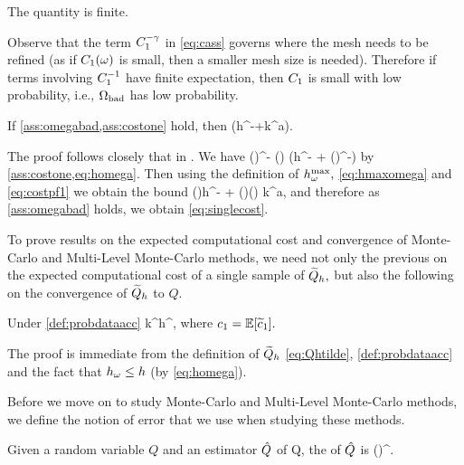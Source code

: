 \label{ass:omegabad}
The quantity
\beq\label{eq:cass}
\cth \de {}
\eeq
is finite.
\eas

Observe that the term $C_{1}^{-\gamma}$ in \cref{eq:cass} governs where the mesh needs to be refined (as if $C_{1}(\omega)$ is small, then a smaller mesh size is needed). Therefore if terms involving $C_{1}^{-1}$ have finite expectation, then $C_{1}$ is small with low probability, i.e., $\Omega_{\mathrm{bad}}$ has low probability.

\label{lem:c}
If \cref{ass:omegabad,ass:costone} hold, then 
\beq\label{eq:singlecost}
\EXP{\Cost{\Qhtilde}} \leq \cth \mleft(h^{-\gamma}+k^{a\gamma}\mright).
\eeq
\ele

The proof follows closely that in \cite[Lemma 5.8]{GrPaSc:19}.
We have
\beq\label{eq:costpf1}
\Cost{\Qhtilde(\omega)} \leq \cthtilde(\omega)\homega^{-\gamma} \leq \cthtilde(\omega) \mleft(h^{-\gamma} + \mleft(\hmaxomega\mright)^{-\gamma}\mright)
\eeq
by \cref{ass:costone,eq:homega}. Then using  the definition of $h^{\max}_{\omega},$ \cref{eq:hmaxomega} and \cref{eq:costpf1} we obtain the bound
\beq\label{eq:costpf2}
\Cost{\Qhtilde(\omega)} \leq \cthtilde(\omega)h^{-\gamma} + \mleft(\cthtilde\Co\mright)(\omega) k^{a\gamma},
\eeq
and therefore as \cref{ass:omegabad} holds, we obtain \cref{eq:singlecost}.
\epf

To prove results on the expected computational cost and convergence of Monte-Carlo and Multi-Level Monte-Carlo methods, we need not only the previous  on the expected computational cost of a single sample of $\widetilde{Q}_{h},$ but also the following  on the convergence of $\widetilde{Q}_{h}$ to $Q$.

\label{ass:a}
Under \cref{def:probdataacc}
\beqs
{} \leq \co k^\sigma h^{\alpha},
\eeqs
where $\co = \EXP{\cotilde}.$
\ele

The proof is immediate from the definition of $\widetilde{Q}_{h}$ \cref{eq:Qhtilde}, \cref{def:probdataacc} and the fact that $h_{\omega} \leq h$ (by \cref{eq:homega}).
\epf

Before we move on to study Monte-Carlo and Multi-Level Monte-Carlo methods, we define the notion of error that we use when studying these methods.

\label{def:rmse}
Given a random variable $Q$ and an estimator $\hat{Q}$ of Q, the  of $\hat{Q}$ is
\beqs
\err{\Qhat} \de \mleft(\mright)^{\half}.
\eeqs
\ede

